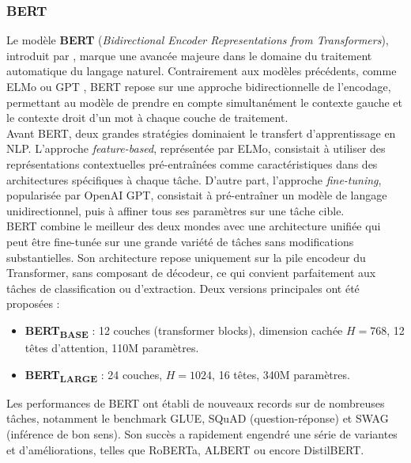 \subsubsection{BERT}

Le modèle \textbf{BERT} (\textit{Bidirectional Encoder Representations from Transformers}), introduit par \citep{devlin2018bert}, marque une avancée majeure dans le domaine du traitement automatique du langage naturel. Contrairement aux modèles précédents, comme ELMo \citep{peters2018deep} ou GPT \citep{radford2018gpt1}, BERT repose sur une approche bidirectionnelle de l'encodage, permettant au modèle de prendre en compte simultanément le contexte gauche et le contexte droit d’un mot à chaque couche de traitement.\\

Avant BERT, deux grandes stratégies dominaient le transfert d'apprentissage en NLP. L'approche \textit{feature-based}, représentée par ELMo, consistait à utiliser des représentations contextuelles pré-entraînées comme caractéristiques dans des architectures spécifiques à chaque tâche. D'autre part, l'approche \textit{fine-tuning}, popularisée par OpenAI GPT, consistait à pré-entraîner un modèle de langage unidirectionnel, puis à affiner tous ses paramètres sur une tâche cible.\\

BERT combine le meilleur des deux mondes avec une architecture unifiée qui peut être fine-tunée sur une grande variété de tâches sans modifications substantielles. Son architecture repose uniquement sur la pile encodeur du Transformer, sans composant de décodeur, ce qui convient parfaitement aux tâches de classification ou d'extraction. Deux versions principales ont été proposées :
\begin{itemize}
    \item \textbf{BERT\textsubscript{BASE}} : 12 couches (transformer blocks), dimension cachée $H=768$, 12 têtes d'attention, 110M paramètres.
    \item \textbf{BERT\textsubscript{LARGE}} : 24 couches, $H=1024$, 16 têtes, 340M paramètres.
\end{itemize}

Les performances de BERT ont établi de nouveaux records sur de nombreuses tâches, notamment le benchmark GLUE, SQuAD (question-réponse) et SWAG (inférence de bon sens). Son succès a rapidement engendré une série de variantes et d'améliorations, telles que RoBERTa, ALBERT ou encore DistilBERT.\\

